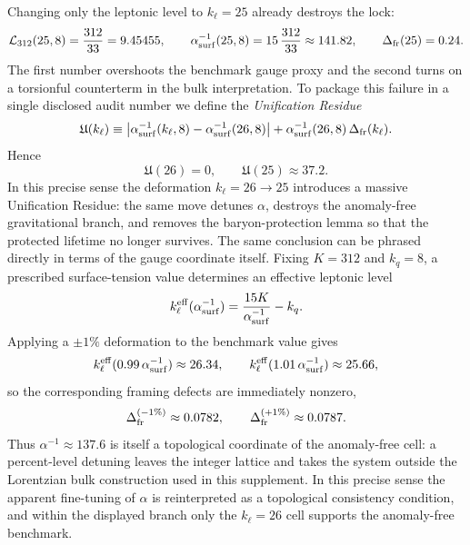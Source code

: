 \documentclass[11pt]{article}
\begin{document}
Changing only the leptonic level to $k_{\ell}=25$ already destroys the lock:
\begin{equation}
 \mathcal L_{312}(25,8)=\frac{312}{33}=9.45455,
 \qquad
 \alpha^{-1}_{\rm surf}(25,8)=15\,\frac{312}{33}\approx 141.82,
 \qquad
 \Delta_{\rm fr}(25)=0.24.
\end{equation}
The first number overshoots the benchmark gauge proxy and the second turns on a
torsionful counterterm in the bulk interpretation. To package this failure in a
single disclosed audit number we define the \emph{Unification Residue}
\begin{equation}
 \mathfrak U(k_{\ell})
 \equiv
 \left|\alpha^{-1}_{\rm surf}(k_{\ell},8)-\alpha^{-1}_{\rm surf}(26,8)\right|
 + \alpha^{-1}_{\rm surf}(26,8)\,\Delta_{\rm fr}(k_{\ell}).
\end{equation}
Hence
\begin{equation}
 \mathfrak U(26)=0,
 \qquad
 \mathfrak U(25)\approx 37.2.
\end{equation}
In this precise sense the deformation $k_{\ell}=26\to25$ introduces a massive
Unification Residue: the same move detunes $\alpha$, destroys the anomaly-free
gravitational branch, and removes the baryon-protection lemma so that the
protected lifetime no longer survives.
The same conclusion can be phrased directly in terms of the gauge coordinate
itself. Fixing $K=312$ and $k_q=8$, a prescribed surface-tension value
determines an effective leptonic level
\begin{equation}
 k_{\ell}^{\rm eff}(\alpha^{-1}_{\rm surf})
 =
 \frac{15K}{\alpha^{-1}_{\rm surf}}-k_q.
\end{equation}
Applying a $\pm1\%$ deformation to the benchmark value gives
\begin{equation}
 k_{\ell}^{\rm eff}(0.99\,\alpha^{-1}_{\rm surf})\approx 26.34,
 \qquad
 k_{\ell}^{\rm eff}(1.01\,\alpha^{-1}_{\rm surf})\approx 25.66,
\end{equation}
so the corresponding framing defects are immediately nonzero,
\begin{equation}
 \Delta_{\rm fr}^{(-1\%)}\approx 0.0782,
 \qquad
 \Delta_{\rm fr}^{(+1\%)}\approx 0.0787.
\end{equation}
Thus $\alpha^{-1}\approx137.6$ is itself a topological coordinate of the
anomaly-free cell: a percent-level detuning leaves the integer lattice and
takes the system outside the Lorentzian bulk construction used in this supplement. In this precise
sense the apparent fine-tuning of $\alpha$ is reinterpreted as a topological
consistency condition, and within the displayed branch only the $k_{\ell}=26$ cell supports the anomaly-free benchmark.
\end{document}
